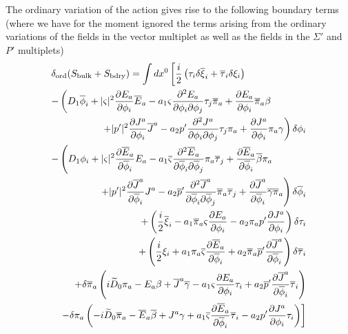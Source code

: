 \documentclass[a4paper,12pt]{article}
\begin{document}
The ordinary variation of the action gives rise to the following boundary
terms (where we have for the moment ignored the terms arising from the
ordinary variations of the fields in the vector multiplet as well
as the fields in the $\Sigma'$ and $P'$ multiplets)
\begin{eqnarray}
\lefteqn{
\delta_{\rm ord} (S_{\rm bulk} + S_{\rm bdry} ) = \int dx^0 
\left[ {i\over2} \left(\tau_i \delta \overline{\xi}_i + \overline{\tau}_i \delta
\xi_i \right) \right.%
}
\nonumber \\
\lefteqn{-\left(D_1\overline{\phi}_i + 
|\varsigma|^2{{\partial E_a}\over{\partial \phi_i}} \overline{E}_a
- a_1\varsigma{{\partial^2
  E_a}\over{\partial\phi_i\partial\phi_j}}
\tau_j \overline{\pi}_a
+{{\partial E_a}\over{\partial \phi_i}}
\overline{\pi}_a \beta \right.} \nonumber \\
&&\left.\hspace{0.4in} +|p'|^2{{\partial J^a}\over{\partial \phi_i}} \overline{J}^a 
- a_2 p' {{\partial^2
  J^a}\over{\partial\phi_i\partial\phi_j}}
\tau_j \pi_a
+{{\partial J^a}\over{\partial\phi_i}} \pi_a \gamma
\right) \delta \phi_i 
\nonumber \\
%
\lefteqn{
-\left(D_1\phi_i + 
|\varsigma|^2{{\partial \overline{E}_a}\over{\partial \overline{\phi}_i}} E_a
- a_1\overline{\varsigma}{{\partial^2
  \overline{E}_a}\over{\partial\overline{\phi}_i\partial\overline{\phi}_j}}
\pi_a \overline{\tau}_j
+{{\partial \overline{E}_a}\over{\partial \overline{\phi}_i}}
\overline{\beta} \pi_a\right.}
\nonumber \\
&&\left.\hspace{0.4in}
+|p'|^2 {{\partial \overline{J}^a}\over{\partial \overline{\phi}_i}} J^a
- a_2 \overline{p}' {{\partial^2
  \overline{J}^a}\over{\partial\overline{\phi}_i\partial\overline{\phi}_j}}
\overline{\pi}_a \overline{\tau}_j
+{{\partial \overline{J}^a}\over{\partial \overline{\phi}_i}}
\overline{\gamma}\overline{\pi}_a
\right) \delta \overline{\phi}_i \nonumber  \\
%
&&+ \left( 
{i\over2}\overline{\xi}_i 
- a_1 \overline{\pi}_a 
\varsigma{{\partial E_a}\over{\partial\phi_i}}
- a_2 \pi_a p' {{\partial J^a}\over{\partial\phi_i}} \right) \delta \tau_i 
\nonumber \\
%
&&
+ \left({i\over2}\xi_i 
+ a_1 \pi_a \overline{\varsigma}
{{\partial \overline{E}_a}\over{\partial\overline{\phi}_i}}
+ a_2 \overline{\pi}_a \overline{p}'
{{\partial \overline{J}^a}\over{\partial\overline{\phi}_i}}
 \right) \delta \overline{\tau}_i \nonumber   \\
%
&& +\delta \overline{\pi}_a \left( i \widetilde{D}_0\pi_a -E_a\beta
+\overline{J}^a \overline{\gamma}
-a_1
\varsigma{{\partial E_a}\over{\partial\phi_i}} \tau_i +a_2
\overline{p}'
{{\partial \overline{J}^a}\over{\partial\overline{\phi}_i}} \overline{\tau}_i
\right) \\
%
&&\left.-\delta \pi_a \left( -i \widetilde{D}_0\overline{\pi}_a
-\overline{E}_a\overline{\beta} + J^a\gamma
+a_1 \overline{\varsigma}
{{\partial \overline{E}_a}\over{\partial\overline{\phi}_i}} \overline{\tau}_i
- a_2 p' {{\partial J^a}\over{\partial\phi_i}} \tau_i 
\right)\right]\nonumber 
\end{eqnarray}
\end{document}
